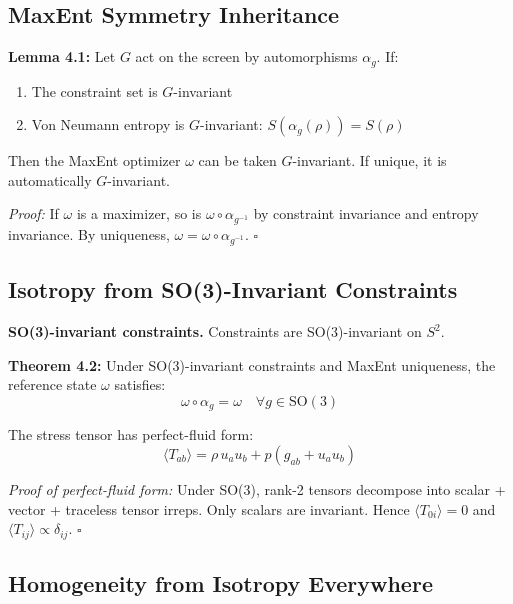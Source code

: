 \subsection{MaxEnt Symmetry Inheritance}\label{41-maxent-symmetry-inheritance}

\textbf{Lemma 4.1:} Let \(G\) act on the screen by automorphisms \(\alpha_g\). If:

\begin{enumerate}
\def\labelenumi{\arabic{enumi}.}
\tightlist
\item
 The constraint set is \(G\)-invariant
\item
 Von Neumann entropy is \(G\)-invariant: \(S(\alpha_g(\rho)) = S(\rho)\)
\end{enumerate}

Then the MaxEnt optimizer \(\omega\) can be taken \(G\)-invariant. If unique, it is automatically \(G\)-invariant.

\emph{Proof:} If \(\omega\) is a maximizer, so is \(\omega \circ \alpha_{g^{-1}}\) by constraint invariance and entropy invariance. By uniqueness, \(\omega = \omega \circ \alpha_{g^{-1}}\). \(\square\)

\subsection{Isotropy from SO(3)-Invariant Constraints}\label{42-isotropy-from-so3-invariant-constraints}

\textbf{SO(3)-invariant constraints.} Constraints are SO(3)-invariant on \(S^2\).

\textbf{Theorem 4.2:} Under SO(3)-invariant constraints and MaxEnt uniqueness, the reference state \(\omega\) satisfies: \[\omega \circ \alpha_g = \omega \quad \forall g \in \text{SO}(3)\]

The stress tensor has perfect-fluid form: \[\langle T_{ab} \rangle = \rho \, u_a u_b + p(g_{ab} + u_a u_b)\]

\emph{Proof of perfect-fluid form:} Under SO(3), rank-2 tensors decompose into scalar + vector + traceless tensor irreps. Only scalars are invariant. Hence \(\langle T_{0i} \rangle = 0\) and \(\langle T_{ij} \rangle \propto \delta_{ij}\). \(\square\)

\subsection{Homogeneity from Isotropy Everywhere}\label{43-homogeneity-from-isotropy-everywhere}

